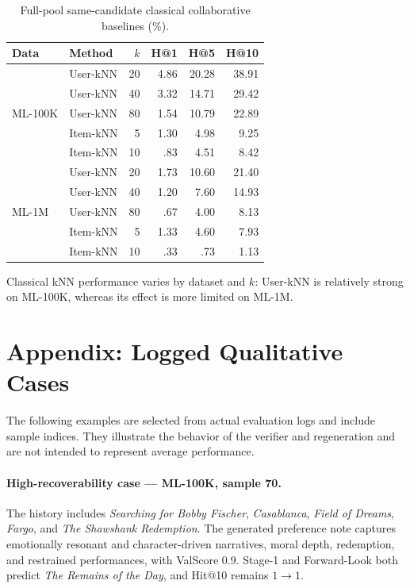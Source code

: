 \documentclass[11pt]{article}
\begin{document}
\begin{table}[h]
\centering
\small
\setlength{\tabcolsep}{4pt}
\begin{tabular}{llrrrr}
\toprule
\textbf{Data} & \textbf{Method} & $k$ & \textbf{H@1} & \textbf{H@5} & \textbf{H@10} \\
\midrule
\multirow{5}{*}{ML-100K}
& User-kNN & 20 & 4.86 & 20.28 & 38.91 \\
& User-kNN & 40 & 3.32 & 14.71 & 29.42 \\
& User-kNN & 80 & 1.54 & 10.79 & 22.89 \\
& Item-kNN & 5  & 1.30 & 4.98 & 9.25 \\
& Item-kNN & 10 & .83  & 4.51 & 8.42 \\
\midrule
\multirow{5}{*}{ML-1M}
& User-kNN & 20 & 1.73 & 10.60 & 21.40 \\
& User-kNN & 40 & 1.20 & 7.60 & 14.93 \\
& User-kNN & 80 & .67  & 4.00 & 8.13 \\
& Item-kNN & 5  & 1.33 & 4.60 & 7.93 \\
& Item-kNN & 10 & .33  & .73  & 1.13 \\
\bottomrule
\end{tabular}
\caption{Full-pool same-candidate classical collaborative baselines (\%).}
\label{tab:knn_full}
\end{table}

Classical kNN performance varies by dataset and $k$: User-kNN is relatively strong on ML-100K, whereas its effect is more limited on ML-1M.

\section{Appendix: Logged Qualitative Cases}
\label{app:cases}

The following examples are selected from actual evaluation logs and include sample indices. They illustrate the behavior of the verifier and regeneration and are not intended to represent average performance.

\paragraph{High-recoverability case --- ML-100K, sample 70.}
The history includes \emph{Searching for Bobby Fischer}, \emph{Casablanca}, \emph{Field of Dreams}, \emph{Fargo}, and \emph{The Shawshank Redemption}. The generated preference note captures emotionally resonant and character-driven narratives, moral depth, redemption, and restrained performances, with ValScore 0.9. Stage-1 and Forward-Look both predict \emph{The Remains of the Day}, and Hit@10 remains $1\rightarrow1$.
\end{document}
